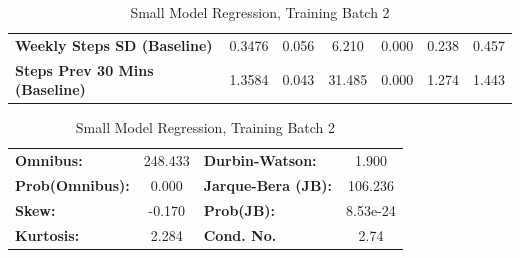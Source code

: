 \begin{table}
\begin{tabular}{lcccccc}
\textbf{Weekly Steps SD (Baseline)}    &       0.3476  &        0.056     &     6.210  &         0.000        &        0.238    &        0.457     \\
\textbf{Steps Prev 30 Mins (Baseline)} &       1.3584  &        0.043     &    31.485  &         0.000        &        1.274    &        1.443     \\
\bottomrule
\end{tabular}
\begin{tabular}{lclc}
\textbf{Omnibus:}       & 248.433 & \textbf{  Durbin-Watson:     } &    1.900  \\
\textbf{Prob(Omnibus):} &   0.000 & \textbf{  Jarque-Bera (JB):  } &  106.236  \\
\textbf{Skew:}          &  -0.170 & \textbf{  Prob(JB):          } & 8.53e-24  \\
\textbf{Kurtosis:}      &   2.284 & \textbf{  Cond. No.          } &     2.74  \\
\bottomrule
\end{tabular}
\caption{Small Model Regression, Training Batch 2}
\end{table}

\medskip

